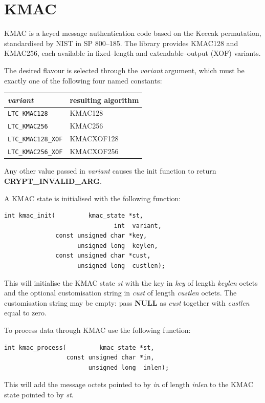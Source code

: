 \documentclass[synpaper]{book}
\newcommand{\mysection}[1]    %
	{                   %
	\section{#1}
   \markboth{\textsf{www.libtom.net}}{\thesection ~ {#1}}
	}
\begin{document}
\mysection{KMAC}

KMAC is a keyed message authentication code based on the Keccak permutation, standardised by NIST in
SP 800--185. The library provides KMAC128 and KMAC256, each available in fixed--length and
extendable--output (XOF) variants.

The desired flavour is selected through the \textit{variant} argument, which must be exactly one of the
following four named constants:

\begin{center}
\begin{tabular}{ll}
\hline
\textit{variant}             & resulting algorithm \\
\hline
\texttt{LTC\_KMAC128}        & KMAC128 \\
\texttt{LTC\_KMAC256}        & KMAC256 \\
\texttt{LTC\_KMAC128\_XOF}   & KMACXOF128 \\
\texttt{LTC\_KMAC256\_XOF}   & KMACXOF256 \\
\hline
\end{tabular}
\end{center}

Any other value passed in \textit{variant} causes the init function to return \textbf{CRYPT\_INVALID\_ARG}.

A KMAC state is initialised with the following function:
\begin{verbatim}
int kmac_init(         kmac_state *st,
                              int  variant,
              const unsigned char *key,
                    unsigned long  keylen,
              const unsigned char *cust,
                    unsigned long  custlen);
\end{verbatim}
This will initialise the KMAC state \textit{st} with the key in \textit{key} of length \textit{keylen} octets
and the optional customisation string in \textit{cust} of length \textit{custlen} octets. The customisation
string may be empty: pass \textbf{NULL} as \textit{cust} together with \textit{custlen} equal to zero.

To process data through KMAC use the following function:
\begin{verbatim}
int kmac_process(         kmac_state *st,
                 const unsigned char *in,
                       unsigned long  inlen);
\end{verbatim}
This will add the message octets pointed to by \textit{in} of length \textit{inlen} to the KMAC state pointed
to by \textit{st}.
\end{document}
